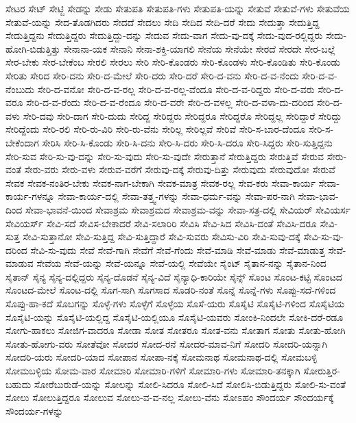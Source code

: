 {ಸೇಟರ
ಸೇಟ್
ಸೇಟ್ಜಿ
ಸೇಡನ್ನು
ಸೇಡು
ಸೇತುಪತಿ
ಸೇತುಪತಿ-ಗಳು
ಸೇತುಪತಿ-ಯನ್ನು
ಸೇತುವೆ
ಸೇತುವೆ-ಗಳು
ಸೇತುವೆಯ
ಸೇತುವೆ-ಯನ್ನು
ಸೇದ-ತೊಡಗಿದರು
ಸೇದದೆ
ಸೇದಲು
ಸೇದಿ
ಸೇದಿದ
ಸೇದಿ-ದರೆ
ಸೇದು
ಸೇದುತ್ತಾ
ಸೇದುತ್ತಿದ್ದ
ಸೇದುತ್ತಿದ್ದನು
ಸೇದುತ್ತಿದ್ದರು
ಸೇದುತ್ತಿದ್ದು-ದನ್ನು
ಸೇದುವ
ಸೇದು-ವಾಗ
ಸೇದು-ವು-ದಕ್ಕೆ
ಸೇದು-ವುದ-ರಲ್ಲಿದ್ದರು
ಸೇದು-ಹೋಗಿ-ಬಿಡುತ್ತಿತ್ತು
ಸೇನಾನಾ-ಯಕ
ಸೇನಾನಿ
ಸೇನಾ-ಶಕ್ತಿ-ಯಾಗಲಿ
ಸೇನೆಯ
ಸೇನೆಯೇ
ಸೇರದೆ
ಸೇರದೇ
ಸೇರ-ಬಲ್ಲೆ
ಸೇರ-ಬೇಕು
ಸೇರ-ಬೇಕೆಂಬ
ಸೇರಲಿ
ಸೇರಲು
ಸೇರಿ
ಸೇರಿ-ಕೊಂಡರು
ಸೇರಿ-ಕೊಂಡಳು
ಸೇರಿ-ಕೊಂಡಿತು
ಸೇರಿ-ಕೊಂಡು
ಸೇರಿತು
ಸೇರಿದ
ಸೇರಿ-ದನು
ಸೇರಿ-ದ-ಮೇಲೆ
ಸೇರಿ-ದರು
ಸೇರಿ-ದರೆ
ಸೇರಿ-ದ-ವನು
ಸೇರಿ-ದ-ವ-ನೆಂದು
ಸೇರಿ-ದ-ವ-ನೆಂಬುದು
ಸೇರಿ-ದ-ವನೋ
ಸೇರಿ-ದ-ವ-ರಲ್ಲ
ಸೇರಿ-ದ-ವ-ರಲ್ಲ-ವೆಂದೂ
ಸೇರಿ-ದ-ವ-ರಿದ್ದರು
ಸೇರಿ-ದ-ವರು
ಸೇರಿ-ದ-ವರೂ
ಸೇರಿ-ದ-ವ-ರೆಂದು
ಸೇರಿ-ದ-ವ-ರೆಂದೂ
ಸೇರಿ-ದ-ವರೇ
ಸೇರಿ-ದ-ವಳಲ್ಲ
ಸೇರಿ-ದ-ವಳಾ-ದು-ದರಿಂದ
ಸೇರಿ-ದ-ವಳು
ಸೇರಿ-ದವು
ಸೇರಿ-ದಾಗ
ಸೇರಿ-ದುದು
ಸೇರಿದ್ದ
ಸೇರಿದ್ದರು
ಸೇರಿದ್ದರೂ
ಸೇರಿದ್ದರೊ
ಸೇರಿದ್ದಲ್ಲ
ಸೇರಿದ್ದಾರೆ
ಸೇರಿದ್ದು
ಸೇರಿದ್ದೆಂದು
ಸೇರಿ-ರಲಿ
ಸೇರಿ-ರು-ವಿರಿ
ಸೇರಿ-ರು-ವೆನು
ಸೇರಿಲ್ಲ
ಸೇರಿಲ್ಲವೆ
ಸೇರಿವೆ
ಸೇರಿ-ಸ-ಬಾರ-ದೆಂದೂ
ಸೇರಿ-ಸ-ಬೇಕೆಂದಾಗ
ಸೇರಿಸಿ
ಸೇರಿ-ಸಿ-ಕೊಂಡು
ಸೇರಿ-ಸಿ-ದನು
ಸೇರಿ-ಸಿ-ದರು
ಸೇರಿ-ಸಿ-ದರೂ
ಸೇರಿ-ಸಿದ್ದರು
ಸೇರಿ-ಸುತ್ತಿದ್ದನು
ಸೇರಿ-ಸುವ
ಸೇರಿ-ಸು-ವು-ದನ್ನು
ಸೇರಿ-ಸು-ವುದು
ಸೇರಿ-ಸು-ವುದೇ
ಸೇರುತ್ತಾನೆ
ಸೇರುತ್ತಿದ್ದರು
ಸೇರುತ್ತಿವೆ
ಸೇರುವ
ಸೇರು-ವಂತೆ
ಸೇರು-ವರು
ಸೇರು-ವಳು
ಸೇರುವ-ವರೆಗೆ
ಸೇರುವು-ದಕ್ಕೆ
ಸೇರುವು-ದಿತ್ತು
ಸೇರುವುದು
ಸೇರುವುದೋ
ಸೇರುವೆ
ಸೇವಕ
ಸೇವಕ-ನಂತಿರ-ಬೇಕು
ಸೇವಕ-ನಾಗ-ಬೇಕಾಗಿ
ಸೇವಕ-ಮಾತ್ರ
ಸೇವಕ-ರಲ್ಲ
ಸೇವ-ಕರು
ಸೇವಾ-ಕಾರ್ಯ
ಸೇವಾ-ಕಾರ್ಯ-ಗಳನ್ನೂ
ಸೇವಾ-ಕಾರ್ಯ-ದಲ್ಲಿ
ಸೇವಾ-ತತ್ತ್ವ-ಗಳನ್ನು
ಸೇವಾ-ಧರ್ಮ-ವನ್ನು
ಸೇವಾ-ಪರ-ನಾಗಿ
ಸೇವಾ-ಭಾವ-ದಿಂದ
ಸೇವಾ-ಭಾವನೆ-ಯಿಂದ
ಸೇವಾಶ್ರಮ
ಸೇವಾಶ್ರಮದ
ಸೇವಾಶ್ರಮ-ವನ್ನು
ಸೇವಾ-ಸತ್ರ-ದಲ್ಲಿ
ಸೇವಿಯರ್
ಸೇವಿಯರ್ಸ
ಸೇವಿಯರ್ಸ್
ಸೇವಿ-ಸದೆ
ಸೇವಿಸ-ಬೇಕಾದರೆ
ಸೇವಿ-ಸಲಾರಿರಿ
ಸೇವಿಸಿ
ಸೇವಿ-ಸಿದ
ಸೇವಿಸಿ-ದಂತೆ
ಸೇವಿಸಿ-ದರೂ
ಸೇವಿ-ಸುತ್ತ
ಸೇವಿ-ಸುತ್ತಾನೋ
ಸೇವಿ-ಸುತ್ತಿದ್ದ
ಸೇವಿ-ಸುತ್ತಿದ್ದಾರೆ
ಸೇವಿ-ಸುವರು
ಸೇವಿಸು-ವಿರಿ
ಸೇವಿ-ಸುವು-ದಕ್ಕೆ
ಸೇವಿ-ಸು-ವು-ದರಿಂದ
ಸೇವಿ-ಸು-ವುದು
ಸೇವೆ
ಸೇವೆ-ಗಾಗಿ
ಸೇವೆಗೆ
ಸೇವೆ-ಗೆಂದು
ಸೇವೆ-ಮಾಡಿ
ಸೇವೆ-ಮಾಡು
ಸೇವೆ-ಮಾಡುತ್ತ
ಸೇವೆ-ಮಾಡುವ
ಸೇವೆಯ
ಸೇವೆ-ಯನ್ನು
ಸೇವೆ-ಯನ್ನೂ
ಸೇವೆ-ಯಲ್ಲಿ
ಸೇವೆಯೇ
ಸೈಂಟ್
ಸೈತಾನ-ನನ್ನು
ಸೈತಾನ-ನಿಂದ
ಸೈತಾನ್
ಸೈನ್ಯ
ಸೈನ್ಯ-ದಲ್ಲಿದ್ದರು
ಸೈನ್ಯ-ದೊಡನೆ
ಸೈನ್ಯ-ವಿದೆ
ಸೈನ್ಯಾಧಿ-ಕಾರಿಯೇ
ಸೈನ್ಸ್
ಸೊಂಟ
ಸೊಂಟ-ಕಟ್ಟಿ
ಸೊಂಟದ
ಸೊಂಟದ-ಮೇಲೆ
ಸೊಂಟ-ದಲ್ಲಿ
ಸೊಗ-ಸಾಗಿ
ಸೊಗಸಾದ
ಸೊಡರಿ-ನಂತೆ
ಸೊನ್ನೆ
ಸೊನ್ನೆ-ಗಳು
ಸೊಪ್ಪು-ಸದೆ-ಗಳಿಂದ
ಸೊಪ್ಪು-ಹಾ-ಕದೆ
ಸೊಬಗನ್ನು
ಸೊಳ್ಳೆ-ಗಳು
ಸೊಳ್ಳೆಗೆ
ಸೊಳ್ಳೆಯ
ಸೊಸೆ-ಯರು
ಸೊಸೈಟಿ
ಸೊಸೈಟಿ-ಗಳಿಂದ
ಸೊಸೈಟಿಯ
ಸೊಸೈಟಿ-ಯನ್ನು
ಸೊಸೈಟಿ-ಯಲ್ಲಿದ್ದ
ಸೊಸೈಟಿ-ಯಲ್ಲಿಯೂ
ಸೊಸೈಟಿ-ಯವರು
ಸೋಂಕಿ-ನಿಂದಲೇ
ಸೋಕಿ-ದರೆ-ರಡೂ
ಸೋಗು-ಹಾಕಲು
ಸೋಜಿಗ-ವಾದರೂ
ಸೋಡಾ
ಸೋತ
ಸೋತರೂ
ಸೋತ-ವನು
ಸೋತಾಗ
ಸೋತು
ಸೋತು-ಹೋಗಿ
ಸೋತು-ಹೋಗು-ವರು
ಸೋತೆವೋ
ಸೋದರ
ಸೋದ-ರನೆ
ಸೋದರ-ಮಾವ-ನಿಗೆ
ಸೋದರಿ
ಸೋದರಿ-ಯನ್ನಾಗಿ
ಸೋದರಿ-ಯರು
ಸೋದರಿ-ಯಾದ
ಸೋಪಾನ
ಸೋಪಾ-ನಕ್ಕೆ
ಸೋಮನಾಥ
ಸೋಮನಾಥ-ದಲ್ಲಿ
ಸೋಮಬಳ್ಳಿ
ಸೋಮಬಳ್ಳಿಯ
ಸೋಮ-ವಾರ
ಸೋಮಾರಿ
ಸೋಮಾರಿ-ಗಳಿಗೆ
ಸೋಮಾರಿ-ಗಳು
ಸೋಮಾರಿ-ತನಕ್ಕಾಗಿ
ಸೋರುತ್ತಿರ-ಬಹುದು
ಸೋರೆಬುರುಡೆ-ಯನ್ನು
ಸೋಲನ್ನು
ಸೋಲಿ-ಸಿದರೂ
ಸೋಲಿ-ಸಿದೆ
ಸೋಲಿಸಿ-ಬಿಡುತ್ತಿದ್ದರು
ಸೋಲಿ-ಸು-ವಂತೆ
ಸೋಲು
ಸೋಲುತ್ತಿದ್ದರೂ
ಸೋಲುವ
ಸೋಲು-ವ-ವ-ನಲ್ಲ
ಸೋಲು-ವೆನು
ಸೋಽಹಂ
ಸೌಂದರ್ಯ
ಸೌಂದರ್ಯಕ್ಕೆ
ಸೌಂದರ್ಯ-ಗಳನ್ನು
}
